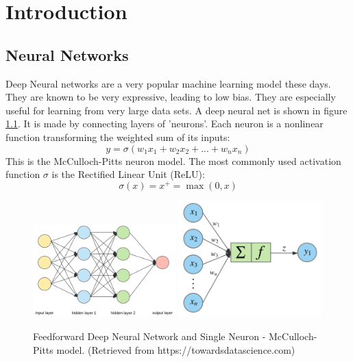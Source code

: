 \chapter{Introduction}
\section{Neural Networks}

Deep Neural networks are a very popular machine learning model these days. They are known to be very expressive, leading to low bias. They are especially useful for learning from very large data sets. A deep neural net is shown in figure \ref{neural}. It is made by connecting layers of 'neurons'. Each neuron is a nonlinear function transforming the weighted sum of its inputs:
\begin{equation*}
      y = \sigma(w_1x_1+w_2x_2+...+w_nx_n)
\end{equation*}
This is the McCulloch-Pitts neuron model. The most commonly used activation function $\sigma$ is the Rectified Linear Unit (ReLU):
\begin{equation*}
      \sigma(x) = x^+ = \max(0,x)
\end{equation*}

   \begin{figure}[b]
	\centering
	\includegraphics[width=0.49\textwidth]{network}
	\includegraphics[width=0.49\textwidth]{neuron}
	\caption{Feedforward Deep Neural Network and Single Neuron - McCulloch-Pitts model. (Retrieved from https://towardsdatascience.com)}
	\label{neural}
	\end{figure}

